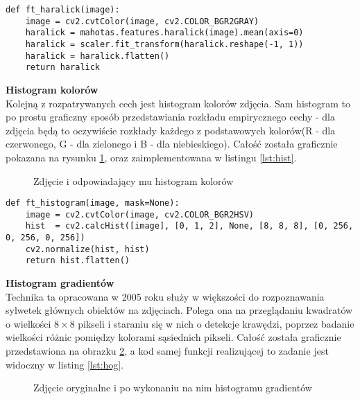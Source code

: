 \begin{lstlisting}[caption={Implementacja przeliczania cechy Haralicka}, label={lst:haralick}]
def ft_haralick(image):
	image = cv2.cvtColor(image, cv2.COLOR_BGR2GRAY)
	haralick = mahotas.features.haralick(image).mean(axis=0)
	haralick = scaler.fit_transform(haralick.reshape(-1, 1))
	haralick = haralick.flatten()
	return haralick
\end{lstlisting}

\textbf{Histogram kolorów} \\

Kolejną z rozpatrywanych cech jest histogram kolorów zdjęcia. Sam histogram to po prostu graficzny sposób przedstawiania rozkładu empirycznego cechy - dla zdjęcia będą to oczywiście rozkłady każdego z podstawowych kolorów(R - dla czerwonego, G - dla zielonego i B - dla niebieskiego). Całość została graficznie pokazana na rysunku \ref{fig:lena}, oraz zaimplementowana w listingu \ref{lst:hist}.

\begin{figure}[h!]
	\centering
	\qquad
	\caption{Zdjęcie i odpowiadający mu histogram kolorów}
	\label{fig:lena}
\end{figure}

\begin{lstlisting}[caption={implementacja wyliczania histogramu kolorów}, label={lst:hist}]
def ft_histogram(image, mask=None):
	image = cv2.cvtColor(image, cv2.COLOR_BGR2HSV)
	hist  = cv2.calcHist([image], [0, 1, 2], None, [8, 8, 8], [0, 256, 0, 256, 0, 256])
	cv2.normalize(hist, hist)
	return hist.flatten()
\end{lstlisting}

\textbf{Histogram gradientów} \\
 
Technika ta opracowana w 2005 roku \cite{hog} służy w większości do rozpoznawania sylwetek głównych obiektów na zdjęciach. Polega ona na przeglądaniu kwadratów o wielkości $8 \times 8$ pikseli i staraniu się w nich o detekcje krawędzi, poprzez badanie wielkości różnic pomiędzy kolorami sąsiednich pikseli. Całość została graficznie przedstawiona na obrazku \ref{fig:hog}, a kod samej funkcji realizującej to zadanie jest widoczny w listing \ref{lst:hog}.

\begin{figure}[h!]
	\centering
	\qquad
	\caption{Zdjęcie oryginalne i po wykonaniu na nim histogramu gradientów}
	\label{fig:hog}
\end{figure}

